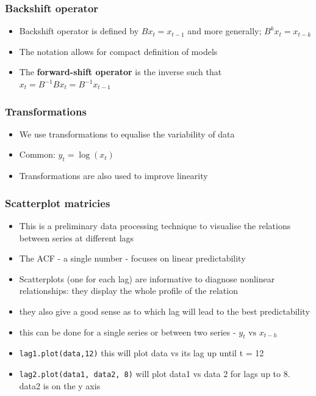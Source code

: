 \documentclass{article}
\begin{document}
\subsubsection{Backshift operator}
\begin{itemize}
    \item Backshift operator is defined by $Bx_t = x_{t-1}$ and more generally; $B^k x_t = x_{t-k}$ 
    \item The notation allows for compact definition of models
    \item The \textbf{forward-shift operator} is the inverse such that $x_t = B^{-1} B x_t = B^{-1} x_{t-1}$
\end{itemize}

\subsubsection{Transformations}
\begin{itemize}
    \item We use transformations to equalise the variability of data
    \item Common: $y_t = \log(x_t)$
    \item Transformations are also used to improve linearity
\end{itemize}

\subsubsection{Scatterplot matricies}

\begin{itemize}
    \item This is a preliminary data processing technique to visualise the relations between series at different lags
    \item The ACF - a single number - focuses on linear predictability
    \item Scatterplots (one for each lag) are informative to diagnose nonlinear relationships: they display the whole profile of the relation
    \item they also give a good sense as to which lag will lead to the best predictability
    \item this can be done for a single series or between two series - $y_t \text{ vs } x_{t-h}$
    \item \texttt{lag1.plot(data,12)} this will plot data vs its lag up until t = 12
    \item \texttt{lag2.plot(data1, data2, 8)} will plot data1 vs data 2 for lags up to 8. data2 is on the y axis
\end{itemize}
\end{document}
